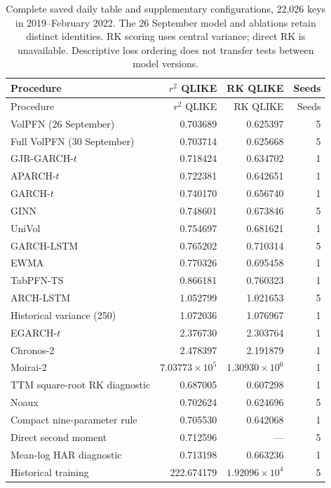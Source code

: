 \begingroup\small\setlength{\tabcolsep}{4pt}
\begin{longtable}{@{}>{\raggedright\arraybackslash}p{6.5cm}rrr@{}}
\caption[Complete common-period daily scores]{Complete saved daily table and supplementary configurations, 22,026 keys in 2019--February 2022. The 26 September model and ablations retain distinct identities. RK scoring uses central variance; direct RK is unavailable. Descriptive loss ordering does not transfer tests between model versions.}\label{tab:new-daily-common-all}\\
\toprule
Procedure & $r^2$ QLIKE & RK QLIKE & Seeds \\
\midrule\endfirsthead
\toprule
Procedure & $r^2$ QLIKE & RK QLIKE & Seeds \\
\midrule\endhead
VolPFN (26 September) & 0.703689 & 0.625397 & 5 \\
Full VolPFN (30 September) & 0.703714 & 0.625668 & 5 \\
GJR-GARCH-$t$ & 0.718424 & 0.634702 & 1 \\
APARCH-$t$ & 0.722381 & 0.642651 & 1 \\
GARCH-$t$ & 0.740170 & 0.656740 & 1 \\
GINN & 0.748601 & 0.673846 & 5 \\
UniVol & 0.754697 & 0.681621 & 1 \\
GARCH-LSTM & 0.765202 & 0.710314 & 5 \\
EWMA & 0.770326 & 0.695458 & 1 \\
TabPFN-TS & 0.866181 & 0.760323 & 1 \\
ARCH-LSTM & 1.052799 & 1.021653 & 5 \\
Historical variance (250) & 1.072036 & 1.076967 & 1 \\
EGARCH-$t$ & 2.376730 & 2.303764 & 1 \\
Chronos-2 & 2.478397 & 2.191879 & 1 \\
Moirai-2 & $7.03773\times10^{5}$ & $1.30930\times10^{6}$ & 1 \\
TTM square-root RK diagnostic & 0.687005 & 0.607298 & 1 \\
Noaux & 0.702624 & 0.624696 & 5 \\
Compact nine-parameter rule & 0.705530 & 0.642068 & 1 \\
Direct second moment & 0.712596 & --- & 5 \\
Mean-log HAR diagnostic & 0.713198 & 0.663236 & 1 \\
Historical training & 222.674179 & $1.92096\times10^{4}$ & 5 \\
\bottomrule
\end{longtable}\endgroup
